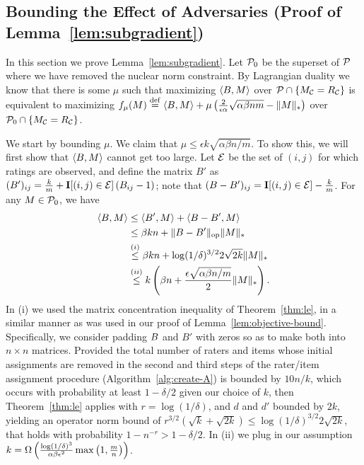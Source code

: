 \subsection{Bounding the Effect of Adversaries (Proof of Lemma~\ref{lem:subgradient})}
\label{sec:subgradient-proof}
In this section we prove Lemma~\ref{lem:subgradient}.
Let $\mathcal{P}_0$ be the superset of $\mathcal{P}$ where we have removed the 
nuclear norm constraint. By Lagrangian duality we 
know that there is some $\mu$ such that maximizing 
$\langle B, M \rangle$ over $\mathcal{P} \cap \{M_{\mathcal{C}} = R_{\mathcal{C}}\}$ 
is equivalent to maximizing $f_\mu(M) \stackrel{\rm def}{=} \langle B, M \rangle + \mu\left( \frac{2}{\epsilon\alpha}\sqrt{\alpha\beta nm} - \|M\|_* \right)$ over 
$\mathcal{P}_0 \cap \{M_{\mathcal{C}} = R_{\mathcal{C}}\}$. 

We start by bounding $\mu$. We claim that 
$\mu \leq \epsilon k \sqrt{\alpha\beta n/m}$. 
To show this, we will first show that $\langle B, M \rangle$ cannot get 
too large. Let $\mathcal{E}$ be the set of $(i,j)$ for which ratings are observed, 
and define the matrix $B'$ as 
$(B')_{ij} = \frac{k}{m} + \mathbf{I}[(i,j) \in \mathcal{E}]\left( B_{ij} - 1 \right)$; note 
that $(B-B')_{ij} = \mathbf{I}[(i,j) \in \mathcal{E}] - \frac{k}{m}$.
For any $M \in \mathcal{P}_0$, we have 
\begin{align}
\langle B, M \rangle &\leq \langle B', M \rangle + \langle B - B', M \rangle \\
 &\leq \beta kn + \|B - B'\|_{\mathrm{op}}\|M\|_* \\
 &\stackrel{(i)}{\leq} \beta kn + \log(1/\delta)^{3/2} 2\sqrt{2k}\|M\|_* \\
 &\stackrel{(ii)}{\leq} k\left( \beta n +  \frac{\epsilon\sqrt{\alpha\beta n/m}}{2} \|M\|_* \right).
\end{align}
In (i) we used the matrix concentration inequality of Theorem~\ref{thm:le}, in a similar manner as was used in our proof of Lemma~\ref{lem:objective-bound}.  Specifically, we consider padding $B$ and $B'$ with zeros so as to make both into $n\times n$ matrices. Provided the total number of raters and items whose initial assignments are removed in the second and third steps of the rater/item assignment procedure (Algorithm~\ref{alg:create-A}) is bounded by $10n/k$, which occurs with probability at least $1-\delta/2$ given our choice of $k$, then Theorem~\ref{thm:le} applies with $r = \log (1/\delta)$, and $d$ and $d'$ bounded by $2k$, yielding an operator norm bound of $r^{3/2}(\sqrt{k} +\sqrt{2k}) \le \log(1/\delta)^{3/2} 2\sqrt{2k}$, that holds with probability $1-n^{-r} > 1-\delta/2$.  In (ii) we plug in our assumption $k = \Omega\left( \frac{\log(1/\delta)^3}{\alpha\beta\epsilon^2}\max\left( 1,\frac{m}{n} \right) \right)$.

